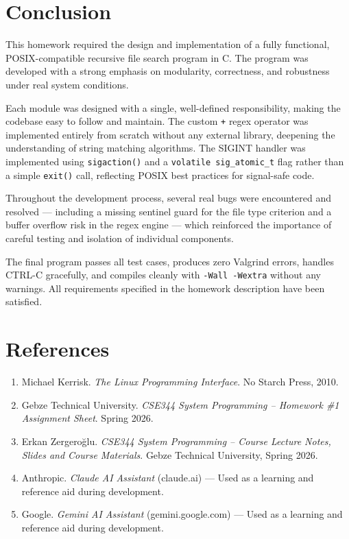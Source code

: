 \documentclass[12pt, a4paper]{article}
\begin{document}
\section{Conclusion}

This homework required the design and implementation of a fully functional, POSIX-compatible
recursive file search program in C. The program was developed with a strong emphasis on
modularity, correctness, and robustness under real system conditions.

Each module was designed with a single, well-defined responsibility, making the codebase
easy to follow and maintain. The custom \texttt{+} regex operator was implemented entirely
from scratch without any external library, deepening the understanding of string matching
algorithms. The SIGINT handler was implemented using \texttt{sigaction()} and a
\texttt{volatile sig\_atomic\_t} flag rather than a simple \texttt{exit()} call, reflecting
POSIX best practices for signal-safe code.

Throughout the development process, several real bugs were encountered and resolved —
including a missing sentinel guard for the file type criterion and a buffer overflow risk
in the regex engine — which reinforced the importance of careful testing and isolation
of individual components.

The final program passes all test cases, produces zero Valgrind errors, handles CTRL-C
gracefully, and compiles cleanly with \texttt{-Wall -Wextra} without any warnings.
All requirements specified in the homework description have been satisfied.

\section{References}

\begin{enumerate}[noitemsep]

    \item Michael Kerrisk. \textit{The Linux Programming Interface}. No Starch Press, 2010.

    \item Gebze Technical University. \textit{CSE344 System Programming -- Homework \#1 Assignment Sheet}. Spring 2026.

    \item Erkan Zergeroğlu. \textit{CSE344 System Programming -- Course Lecture Notes, Slides and Course Materials}. Gebze Technical University, Spring 2026.

    \item Anthropic. \textit{Claude AI Assistant} (claude.ai) --- Used as a learning and reference aid during development.

    \item Google. \textit{Gemini AI Assistant} (gemini.google.com) --- Used as a learning and reference aid during development.

\end{enumerate}
\end{document}

